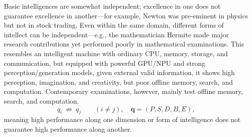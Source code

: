 \documentclass[12pt,a4paper]{article}
\begin{document}
Basic intelligences are somewhat independent; excellence in one does not guarantee excellence in another---for example, Newton was pre-eminent in physics but not in stock trading. Even within the same domain, different forms of intellect can be independent---e.g., the mathematician Hermite made major research contributions yet performed poorly in mathematical examinations. This resembles an intelligent machine with ordinary CPU, memory, storage, and communication, but equipped with powerful GPU/NPU and strong perception/generation models, given external valid information, it shows high perception, imagination, and creativity, but poor offline memory, search, and computation. Contemporary examinations, however, mainly test offline memory, search, and computation.
\begin{equation}
q_i\ \not\Rightarrow\ q_j\qquad (i\neq j),\quad \mathbf{q}=(P,S,D,B,E),
\label{eq:intelligence-independence}
\end{equation}
meaning high performance along one dimension or form of intelligence does not guarantee high performance along another.
\end{document}
